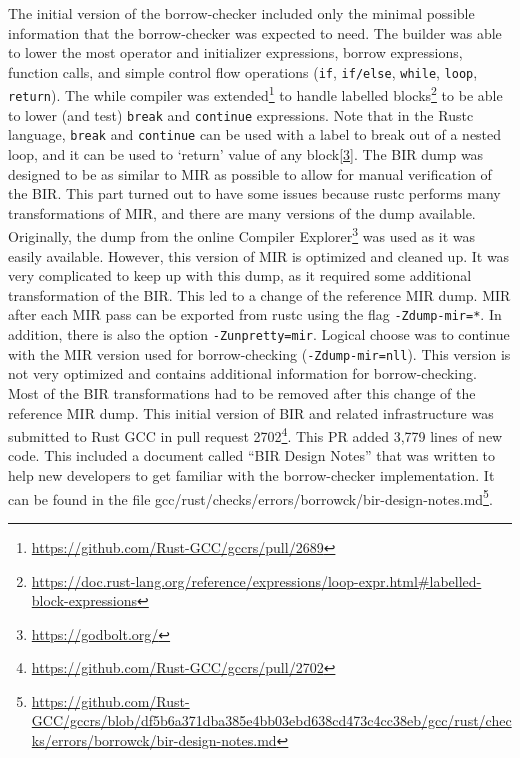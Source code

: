 \documentclass[
  11pt,
  twoside,symmetric]{report}
\DeclareRobustCommand{\href}[2]{#2\footnote{\url{#1}}}
\begin{document}
The initial version of the borrow-checker included only the minimal
possible information that the borrow-checker was expected to need. The
builder was able to lower the most operator and initializer expressions,
borrow expressions, function calls, and simple control flow operations
(\texttt{if}, \texttt{if/else}, \texttt{while}, \texttt{loop},
\texttt{return}). The while compiler was
\href{https://github.com/Rust-GCC/gccrs/pull/2689}{extended} to handle
\href{https://doc.rust-lang.org/reference/expressions/loop-expr.html\#labelled-block-expressions}{labelled
blocks} to be able to lower (and test) \texttt{break} and
\texttt{continue} expressions. Note that in the Rustc language,
\texttt{break} and \texttt{continue} can be used with a label to break
out of a nested loop, and it can be used to `return' value of any
block\protect\hyperlink{ref-reference}{{[}3{]}}. The BIR dump was
designed to be as similar to MIR as possible to allow for manual
verification of the BIR. This part turned out to have some issues
because rustc performs many transformations of MIR, and there are many
versions of the dump available. Originally, the dump from the online
\href{https://godbolt.org/}{Compiler Explorer} was used as it was easily
available. However, this version of MIR is optimized and cleaned up. It
was very complicated to keep up with this dump, as it required some
additional transformation of the BIR. This led to a change of the
reference MIR dump. MIR after each MIR pass can be exported from rustc
using the flag \texttt{-Zdump-mir=*}. In addition, there is also the
option \texttt{-Zunpretty=mir}. Logical choose was to continue with the
MIR version used for borrow-checking (\texttt{-Zdump-mir=nll}). This
version is not very optimized and contains additional information for
borrow-checking. Most of the BIR transformations had to be removed after
this change of the reference MIR dump. This initial version of BIR and
related infrastructure was submitted to Rust GCC in
\href{https://github.com/Rust-GCC/gccrs/pull/2702}{pull request 2702}.
This PR added 3,779 lines of new code. This included a document called
``BIR Design Notes'' that was written to help new developers to get
familiar with the borrow-checker implementation. It can be found in the
file
\href{https://github.com/Rust-GCC/gccrs/blob/df5b6a371dba385e4bb03ebd638cd473c4cc38eb/gcc/rust/checks/errors/borrowck/bir-design-notes.md}{gcc/rust/checks/errors/borrowck/bir-design-notes.md}.
\end{document}
